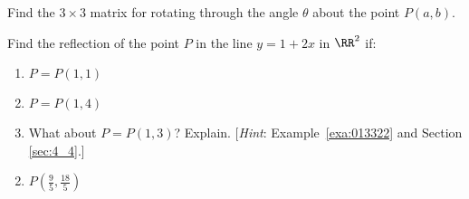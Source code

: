 \begin{multicols}{2}
\begin{ex}
Find the $3 \times 3$ matrix for rotating through the angle $\theta$ about the point $P(a, b)$.
\end{ex}

\begin{ex}
Find the reflection of the point $P$ in the line $y = 1 + 2x$ in $\RR^2$ if:


\begin{enumerate}[label={\alph*.}]
\item $P = P(1, 1)$

\item $P = P(1, 4)$

\item What about $P = P(1, 3)$? Explain. [\textit{Hint}: Example~\ref{exa:013322} and Section \ref{sec:4_4}.]

\end{enumerate}
\begin{sol}
\begin{enumerate}[label={\alph*.}]
\setcounter{enumi}{1}
\item  $P(\frac{9}{5}, \frac{18}{5})$


\end{enumerate}
\end{sol}
\end{ex}
\end{multicols}
